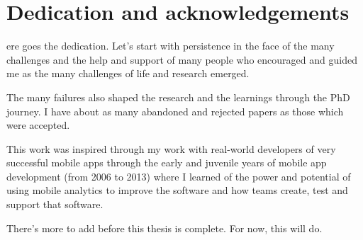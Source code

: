 %
%

\chapter*{Dedication and acknowledgements}
\begin{SingleSpace}
ere goes the dedication. Let's start with persistence in the face of the many challenges and the help and support of many people who encouraged and guided me as the many challenges of life and research emerged.

The many failures also shaped the research and the learnings through the PhD journey. I have about as many abandoned and rejected papers as those which were accepted. 

This work was inspired through my work with real-world developers of very successful mobile apps through the early and juvenile years of mobile app development (from 2006 to 2013) where I learned of the power and potential of using mobile analytics to improve the software and how teams create, test and support that software.

There's more to add before this thesis is complete. For now, this will do.
\end{SingleSpace}
\clearpage